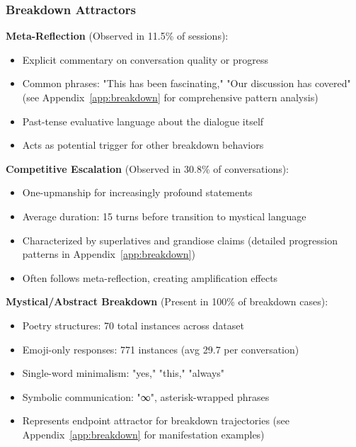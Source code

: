 \documentclass[11pt,letterpaper]{article}
\newcommand{\exponedataMetaReflectionTriggers}{11.5\%}
\newcommand{\exponedataCompetitiveEscalationPercentage}{30.8\%}
\newcommand{\exponedataMysticalBreakdownInBreakdowns}{100\%}
\newcommand{\exponedataCompetitivePhaseLength}{15}
\newcommand{\exponedataPoetryStructures}{70}
\newcommand{\exponedataEmojiResponses}{771}
\newcommand{\exponedataAvgEmojiPerConv}{29.7}
\begin{document}
\subsubsection{Breakdown Attractors}

\textbf{Meta-Reflection} (Observed in \exponedataMetaReflectionTriggers{} of sessions):
\begin{itemize}
    \item Explicit commentary on conversation quality or progress
    \item Common phrases: "This has been fascinating," "Our discussion has covered" (see Appendix~\ref{app:breakdown} for comprehensive pattern analysis)
    \item Past-tense evaluative language about the dialogue itself
    \item Acts as potential trigger for other breakdown behaviors
\end{itemize}

\textbf{Competitive Escalation} (Observed in \exponedataCompetitiveEscalationPercentage{} of conversations):
\begin{itemize}
    \item One-upmanship for increasingly profound statements
    \item Average duration: \exponedataCompetitivePhaseLength{} turns before transition to mystical language
    \item Characterized by superlatives and grandiose claims (detailed progression patterns in Appendix~\ref{app:breakdown})
    \item Often follows meta-reflection, creating amplification effects
\end{itemize}

\textbf{Mystical/Abstract Breakdown} (Present in \exponedataMysticalBreakdownInBreakdowns{} of breakdown cases):
\begin{itemize}
    \item Poetry structures: \exponedataPoetryStructures{} total instances across dataset
    \item Emoji-only responses: \exponedataEmojiResponses{} instances (avg \exponedataAvgEmojiPerConv{} per conversation)
    \item Single-word minimalism: "yes," "this," "always"
    \item Symbolic communication: "∞", asterisk-wrapped phrases
    \item Represents endpoint attractor for breakdown trajectories (see Appendix~\ref{app:breakdown} for manifestation examples)
\end{itemize}
\end{document}

